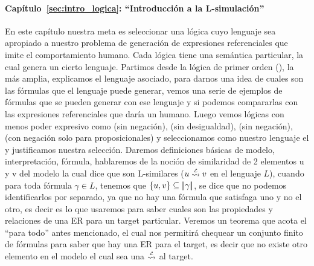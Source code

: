 \paragraph{Cap\'itulo~\ref{sec:intro_logica}: ``Introducci\'on a la L-simulaci\'on''} En este cap\'itulo nuestra meta es seleccionar una l\'ogica cuyo lenguaje sea apropiado a nuestro problema de generaci\'on de expresiones referenciales que imite el comportamiento humano. Cada l\'ogica tiene una sem\'antica particular, la cual genera un cierto lenguaje. Partimos desde la l\'ogica de primer orden (\FOL), la m\'as amplia, explicamos el lenguaje asociado, para darnos una idea de cuales son las f\'ormulas que el lenguaje puede generar, vemos una serie de ejemplos de f\'ormulas que se pueden generar con ese lenguaje y si podemos compararlas con las expresiones referenciales que dar\'ia un humano. Luego vemos l\'ogicas con menos poder expresivo como \EPFOL (\FOL sin negaci\'on), \ALC (\FOL sin desigualdad), \EL(\ALC sin negaci\'on), \ELAN (\ALC con negaci\'on solo para proposicionales) y seleccionamos como nuestro lenguaje el \EL y justificamos nuestra selecci\'on. Daremos definiciones b\'asicas de modelo, interpretaci\'on, f\'ormula, hablaremos de la noci\'on de similaridad de 2 elementos u y v del modelo la cual dice que son L-similares ($u \simil{\+L} v$ en el lenguaje $L$), cuando para toda f\'ormula $\gamma \in L$, tenemos que $\{u,v\} \subseteq |\!|\gamma|\!|$, se dice que no podemos identificarlos por separado, ya que no hay una f\'ormula que satisfaga uno y no el otro, es decir es lo que usaremos para saber cuales son las propiedades y relaciones de una ER para un target particular. Veremos un teorema que acota el ``para todo'' antes mencionado, el cual nos permitir\'a chequear un conjunto finito de f\'ormulas para saber que hay una ER para el target, es decir que no existe otro elemento en el modelo el cual sea una $\simil{\+L}$ al target. 
%

